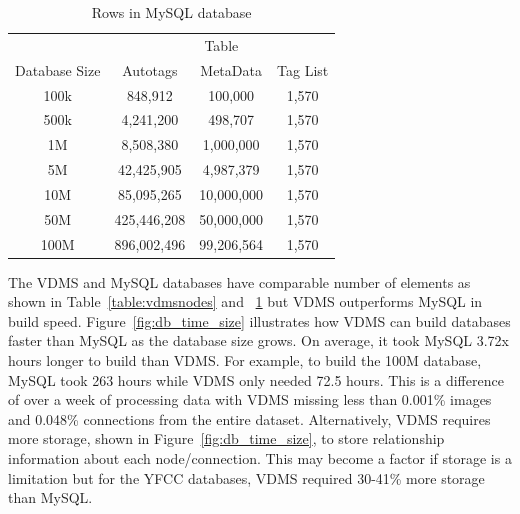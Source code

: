 \begin{table}[h]
\caption{Rows in MySQL database}
\centering
\begin{tabular}{c c c c}
\hline\hline
 & \multicolumn{3}{c}{Table}\\
\cline{2-4}
Database Size & Autotags & MetaData & Tag List\\
\hline
100k & 848,912 & 100,000 & 1,570\\
500k & 4,241,200 & 498,707 & 1,570\\
1M & 8,508,380 & 1,000,000 & 1,570\\
5M & 42,425,905 & 4,987,379 & 1,570\\
10M & 85,095,265 & 10,000,000 & 1,570\\
50M & 425,446,208 & 50,000,000 & 1,570\\
100M & 896,002,496 & 99,206,564 & 1,570\\
\hline
\end{tabular}
\label{table:mysqltables}
\end{table}

The VDMS and MySQL databases have comparable number of elements as shown in Table~\ref{table:vdmsnodes} and ~\ref{table:mysqltables} but VDMS outperforms MySQL in build speed.  Figure~\ref{fig:db_time_size} illustrates how VDMS can build databases faster than MySQL as the database size grows.  On average, it took MySQL 3.72x hours longer to build than VDMS. For example, to build the 100M database, MySQL took 263 hours while VDMS only needed 72.5 hours.  This is a difference of over a week of processing data with VDMS missing less than 0.001\% images and 0.048\% connections from the entire dataset.  Alternatively, VDMS requires more storage, shown in Figure~\ref{fig:db_time_size}, to store relationship information about each node/connection.  This may become a factor if storage is a limitation but for the YFCC databases, VDMS required 30-41\% more storage than MySQL.


